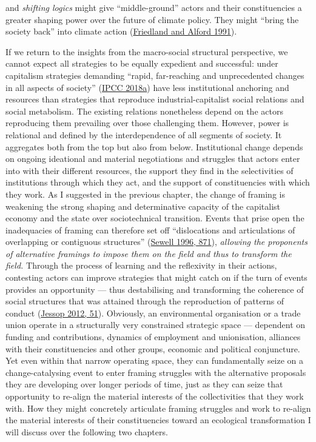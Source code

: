 \documentclass[a4paper, nobind]{templates/ociamthesis}
\begin{document}
and \emph{shifting logics} might give ``middle-ground'' actors and their constituencies a greater shaping power over the future of climate policy. They might ``bring the society back'' into climate action (\protect\hyperlink{ref-friedland_bringing_1991}{Friedland and Alford 1991}).

If we return to the insights from the macro-social structural perspective, we cannot expect all strategies to be equally expedient and successful: under capitalism strategies demanding ``rapid, far-reaching and unprecedented changes in all aspects of society'' (\protect\hyperlink{ref-ipcc_global_2018}{IPCC 2018a}) have less institutional anchoring and resources than strategies that reproduce industrial-capitalist social relations and social metabolism. The existing relations nonetheless depend on the actors reproducing them prevailing over those challenging them. However, power is relational and defined by the interdependence of all segments of society. It aggregates both from the top but also from below. Institutional change depends on ongoing ideational and material negotiations and struggles that actors enter into with their different resources, the support they find in the selectivities of institutions through which they act, and the support of constituencies with which they work. As I suggested in the previous chapter, the change of framing is weakening the strong shaping and determinative capacity of the capitalist economy and the state over sociotechnical transition. Events that prise open the inadequacies of framing can therefore set off ``dislocations and articulations of overlapping or contiguous structures'' (\protect\hyperlink{ref-sewell_historical_1996}{Sewell 1996, 871}), \emph{allowing the proponents of alternative framings to impose them on the field and thus to transform the field.} Through the process of learning and the reflexivity in their actions, contesting actors can improve strategies that might catch on if the turn of events provides an opportunity --- thus destabilising and transforming the coherence of social structures that was attained through the reproduction of patterns of conduct (\protect\hyperlink{ref-jessop_economic_2012}{Jessop 2012, 51}). Obviously, an environmental organisation or a trade union operate in a structurally very constrained strategic space --- dependent on funding and contributions, dynamics of employment and unionisation, alliances with their constituencies and other groups, economic and political conjuncture. Yet even within that narrow operating space, they can fundamentally seize on a change-catalysing event to enter framing struggles with the alternative proposals they are developing over longer periods of time, just as they can seize that opportunity to re-align the material interests of the collectivities that they work with. How they might concretely articulate framing struggles and work to re-align the material interests of their constituencies toward an ecological transformation I will discuss over the following two chapters.
\end{document}

